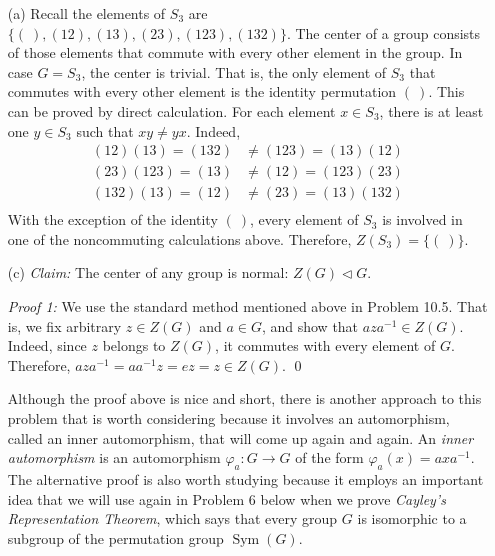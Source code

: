 \documentclass[12pt,reqno]{amsart}
\newcommand{\<}{\ensuremath{\langle}}
\renewcommand{\>}{\ensuremath{\rangle}}
\newcommand{\Sym}{\ensuremath{\operatorname{Sym}}}
\begin{document}
\begin{enumerate}
\begin{enumerate}
 \item[(a)]
Recall the elements of $S_3$ are 
$\{(~), (12), (13), (23), (123), (132)\}$.
The center of a group consists of those elements that commute with
every other element in the group. In case $G = S_3$, the center is trivial.
That is, the only element of $S_3$ that commutes with every other element is the
identity permutation $(~)$.  This can be proved by direct calculation. For each
element $x \in S_3$, there is at least one $y\in S_3$ such that $xy \neq yx$. 
Indeed,
\begin{align*}
  (12)(13) = (132) %
  &\neq (123) = (13)(12)\\[4pt]
  (23)(123) = (13) %
  &\neq (12) = (123)(23)\\[4pt]
  (132)(13) = (12) %
  &\neq (23) = (13)(132)\\[4pt]
\end{align*}
With the exception of the identity $(~)$, every element of $S_3$ is involved in
one of the noncommuting calculations above.  Therefore, $Z(S_3) = \{(~)\}$.

\bigskip
 
 \item[(c)]
\emph{Claim:} The center of any group is normal: $Z(G) \triangleleft G$.

\smallskip

\noindent
\emph{Proof 1:}
We use the standard method mentioned above in Problem 10.5.  That is, we fix
arbitrary $z \in Z(G)$ and $a \in G$, and show that $aza^{-1} \in Z(G)$.
Indeed, since $z$ belongs to  $Z(G)$, it commutes with every element of $G$.
Therefore, $aza^{-1} = aa^{-1}z = e z  = z\in Z(G)$.
\qed

\medskip
Although the proof above is nice and short, there is another approach to this
problem that is worth considering because it involves an automorphism,
called an inner automorphism, that will come up again and again. An 
\emph{inner automorphism} is an automorphism $\varphi_a: G \rightarrow G$ of the
form $\varphi_a(x) = axa^{-1}$.  The alternative proof  is also worth studying
because it employs an important idea that we will use again in Problem 6 below
when we prove \emph{Cayley's Representation Theorem}, which says that
every group $G$ is isomorphic to a subgroup of the permutation group $\Sym(G)$.


\end{enumerate}
\end{enumerate}
\end{document}
